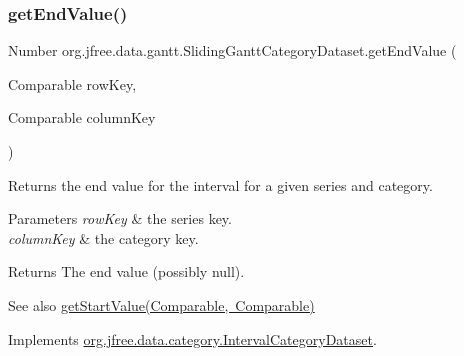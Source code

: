 \mbox{\label{classorg_1_1jfree_1_1data_1_1gantt_1_1_sliding_gantt_category_dataset_ad3151981161728bc2ac87c499a8c1ea6}} 
\subsubsection{\texorpdfstring{get\+End\+Value()}{getEndValue()}\hspace{0.1cm}{\footnotesize\ttfamily [3/4]}}
{\footnotesize\ttfamily Number org.\+jfree.\+data.\+gantt.\+Sliding\+Gantt\+Category\+Dataset.\+get\+End\+Value (\begin{DoxyParamCaption}\item[{Comparable}]{row\+Key,  }\item[{Comparable}]{column\+Key }\end{DoxyParamCaption})}

Returns the end value for the interval for a given series and category.


\begin{DoxyParams}{Parameters}
{\em row\+Key} & the series key. \\
\hline
{\em column\+Key} & the category key.\\
\hline
\end{DoxyParams}
\begin{DoxyReturn}{Returns}
The end value (possibly {\ttfamily null}).
\end{DoxyReturn}
\begin{DoxySeeAlso}{See also}
\mbox{\hyperlink{classorg_1_1jfree_1_1data_1_1gantt_1_1_sliding_gantt_category_dataset_a64e5005f6d459a1a2a11d9bcc4e1b058}{get\+Start\+Value(\+Comparable, Comparable)}} 
\end{DoxySeeAlso}


Implements \mbox{\hyperlink{interfaceorg_1_1jfree_1_1data_1_1category_1_1_interval_category_dataset_a2801c0f15eab2373ff828698f768a4b5}{org.\+jfree.\+data.\+category.\+Interval\+Category\+Dataset}}.

\mbox{\label{classorg_1_1jfree_1_1data_1_1gantt_1_1_sliding_gantt_category_dataset_a5a3c5ebada67a763d8585d3b7950ebe4}} 
